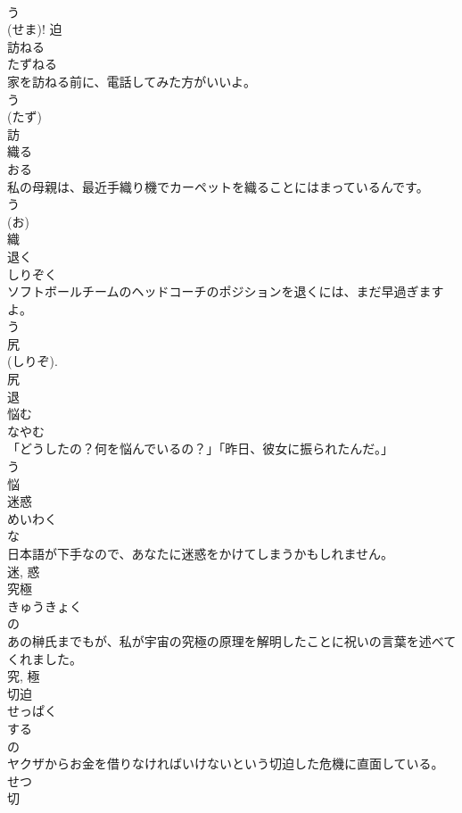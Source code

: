 \documentclass[8pt]{extreport}
\begin{document}
\begin{CJK}{UTF8}{min}
\\	う 
\\	(せま)!	迫	
\\	訪ねる	
\\	たずねる	
\\	家を訪ねる前に、電話してみた方がいいよ。	
\\	う 
\\	(たず) 
\\	訪	
\\	織る	
\\	おる	
\\	私の母親は、最近手織り機でカーペットを織ることにはまっているんです。	
\\	う 
\\	(お) 
\\	織	
\\	退く	
\\	しりぞく	
\\	ソフトボールチームのヘッドコーチのポジションを退くには、まだ早過ぎますよ。	
\\	う 
\\	尻
\\	(しりぞ). 
\\	尻
\\	退	
\\	悩む	
\\	なやむ	
\\	「どうしたの？何を悩んでいるの？」「昨日、彼女に振られたんだ。」	
\\	う 
\\	悩	
\\	迷惑	
\\	めいわく	
\\	な 
\\	日本語が下手なので、あなたに迷惑をかけてしまうかもしれません。	
\\	迷, 惑	
\\	究極	
\\	きゅうきょく	
\\	の 
\\	あの榊氏までもが、私が宇宙の究極の原理を解明したことに祝いの言葉を述べてくれました。	
\\	究, 極	
\\	切迫	
\\	せっぱく	
\\	する 
\\	の 
\\	ヤクザからお金を借りなければいけないという切迫した危機に直面している。	
\\	せつ 
\\	切 

\end{CJK}
\end{document}
